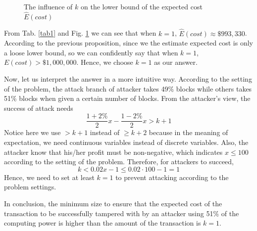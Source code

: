 \documentclass{oxmathproblems}
\makeatletter
\theoremstyle{definition}
\renewenvironment{solution}[1][Solution] {\par\pushQED{\qed}\normalfont\topsep6\p@\@plus6\p@\relax\trivlist\item[\hskip\labelsep\bfseries#1\@addpunct{.}]\ignorespaces}{\popQED\endtrivlist\@endpefalse} \makeatother
\makeatother
\begin{document}
\begin{solution}
\begin{figure}[htbp]
		\caption{The influence of $k$ on the lower bound of the expected cost $\hat{E}(cost)$}
		\label{fig2}
	\end{figure}

	From Tab. \ref{tab1} and Fig. \ref{fig2} we can see that when $k = 1$, $\hat{E}(cost) \approx \$993,330$. According to the previous proposition, since we the estimate expected cost is only a loose lower bound, so we can confidently say that when $k=1$, $E(cost) > \$1,000,000$. Hence, we choose $k = 1$ as our answer.

	Now, let us interpret the answer in a more intuitive way. According to the setting of the problem, the attack branch of attacker takes 49\% blocks while others takes 51\% blocks when given a certain number of blocks. From the attacker's view, the success of attack needs
	$$
	\frac{1 + 2\%}{2}x - \frac{1 - 2\%}{2}x > k + 1
	$$
	Notice here we use $> k + 1$ instead of $\ge k + 2$ because in the meaning of expectation, we need continuous variables instead of discrete variables. Also, the attacker know that his/her profit must be non-negative, which indicates $x \leq 100$ according to the setting of the problem. Therefore, for attackers to succeed,
	$$
	k < 0.02 x - 1 \leq 0.02 \cdot 100 - 1 = 1
	$$
	Hence, we need to set at least $k = 1$ to prevent attacking according to the problem settings.

	In conclusion, the minimum size to ensure that the expected cost of the transaction to be successfully tampered with by an attacker using 51\% of the computing power is higher than the amount of the transaction is $k = 1$.
\end{solution}
\end{document}
